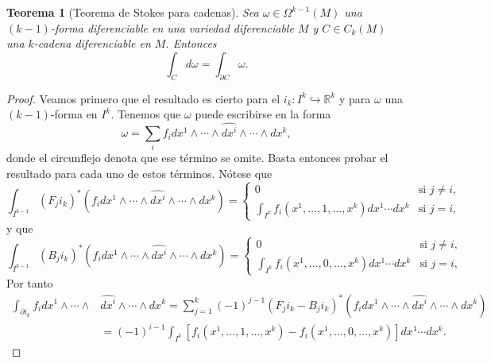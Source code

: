 \documentclass[12pt,a4paper]{book}
\newtheorem{thm}{Teorema}[section]
\theoremstyle{definition} \newtheorem{defn}[thm]{Definición}
\theoremstyle{definition} \newtheorem{ejemplo}[thm]{Ejemplo}
\theoremstyle{definition} \newtheorem{ejercicio}[thm]{Ejercicio}
\theoremstyle{remark} \newtheorem*{obs}{Observación}
\def\RR{\mathbb{R}}
\let\emph\relax
\begin{document}
	  \begin{thm}[Teorema de Stokes para cadenas]
	    Sea $\omega \in \Omega^{k-1}(M)$ una $(k-1)$-forma diferenciable en una variedad diferenciable $M$ y $C\in C_k(M)$ una $k$-cadena diferenciable en $M$. Entonces
	    \begin{equation*}
	      \int_C d\omega = \int_{\partial C}\omega.
	    \end{equation*}
	  \end{thm}
	  \begin{proof}
	    Veamos primero que el resultado es cierto para el \emph{$k$-cubo estándar} $i_k:I^k\hookrightarrow \RR^k$ y para $\omega$ una $(k-1)$-forma en $I^k$. Tenemos que $\omega$ puede escribirse en la forma
	    \begin{equation*}
	      \omega= \sum_i f_i dx^1 \wedge\cdots \wedge \hat{dx^i} \wedge \cdots \wedge dx^k,
	    \end{equation*}
	    donde el circunflejo denota que ese término se omite. Basta entonces probar el resultado para cada uno de estos términos. 
	    Nótese que
	    \begin{equation*}
	      \int_{I^{k-1}} (F_ji_k)^*(f_i dx^1 \wedge\cdots \wedge \hat{dx^i} \wedge \cdots \wedge dx^k)= 
	      \begin{cases}
		0 & \text{si } j \neq i, \\
		\int_{I^k}f_i(x^1,\dots,1,\dots,x^k)dx^1\cdots dx^k & \text{si } j=i,
	      \end{cases}
	    \end{equation*}
	    y que
	    \begin{equation*}
	      \int_{I^{k-1}} (B_ji_k)^*(f_i dx^1 \wedge\cdots \wedge \hat{dx^i} \wedge \cdots \wedge dx^k)= 
	      \begin{cases}
		0 & \text{si } j \neq i, \\
		\int_{I^k}f_i(x^1,\dots,0,\dots,x^k)dx^1\cdots dx^k & \text{si } j=i,
	      \end{cases}
	    \end{equation*}
	    Por tanto
	    \begin{align*}
	      \int_{\partial i_k}f_i dx^1 \wedge \cdots \wedge &\hat{dx^i} \wedge \cdots \wedge dx^k = \sum_{j=1}^k (-1)^{j-1} (F_j i_k - B_j i_k)^*(f_i dx^1 \wedge \cdots \wedge \hat{dx^i} \wedge \cdots \wedge dx^k) \\
	      &=(-1)^{i-1}  \int_{I^k} [f_i (x^1,\dots,1,\dots,x^k)- f_i(x^1,\dots,0,\dots,x^k)]dx^1\cdots dx^k .
	    \end{align*}


\end{proof}
\end{document}
